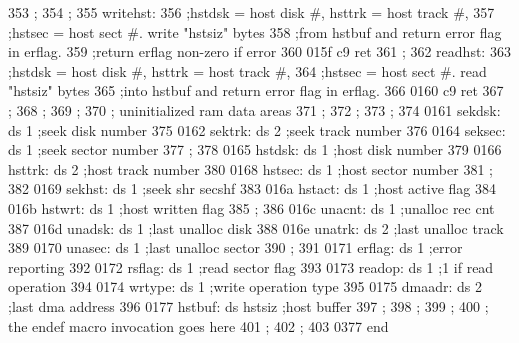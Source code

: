 353                ;
354                ;
355                writehst:
356                          ;hstdsk = host disk #, hsttrk = host track #,
357                          ;hstsec = host sect #. write "hstsiz" bytes
358                          ;from hstbuf and return error flag in erflag.
359                          ;return erflag non-zero if error
360    015f c9               ret
361                ;
362                readhst:
363                          ;hstdsk = host disk #, hsttrk = host track #,
364                          ;hstsec = host sect #. read "hstsiz" bytes
365                          ;into hstbuf and return error flag in erflag.
366    0160 c9               ret
367                ;
368                ;
369                ;
370                ;         uninitialized ram data areas
371                ;
372                ;
373                ;
374    0161        sekdsk:   ds       1                      ;seek disk number
375    0162        sektrk:   ds       2                      ;seek track number
376    0164        seksec:   ds       1                      ;seek sector number
377                ;
378    0165        hstdsk:   ds       1                      ;host disk number
379    0166        hsttrk:   ds       2                      ;host track number
380    0168        hstsec:   ds       1                      ;host sector number
381                ;
382    0169        sekhst:   ds       1                      ;seek shr secshf
383    016a        hstact:   ds       1                      ;host active flag
384    016b        hstwrt:   ds       1                      ;host written flag
385                ;
386    016c        unacnt:   ds       1                      ;unalloc rec cnt
387    016d        unadsk:   ds       1                      ;last unalloc disk
388    016e        unatrk:   ds       2                      ;last unalloc track
389    0170        unasec:   ds       1                      ;last unalloc sector
390                ;
391    0171        erflag:   ds       1                      ;error reporting
392    0172        rsflag:   ds       1                      ;read sector flag
393    0173        readop:   ds       1                      ;1 if read operation
394    0174        wrtype:   ds       1                      ;write operation type
395    0175        dmaadr:   ds       2                      ;last dma address
396    0177        hstbuf:   ds       hstsiz                 ;host buffer
397                ;
398                ;
399                ;
400                ;         the endef macro invocation goes here
401                ;
402                ;
403    0377                  end









